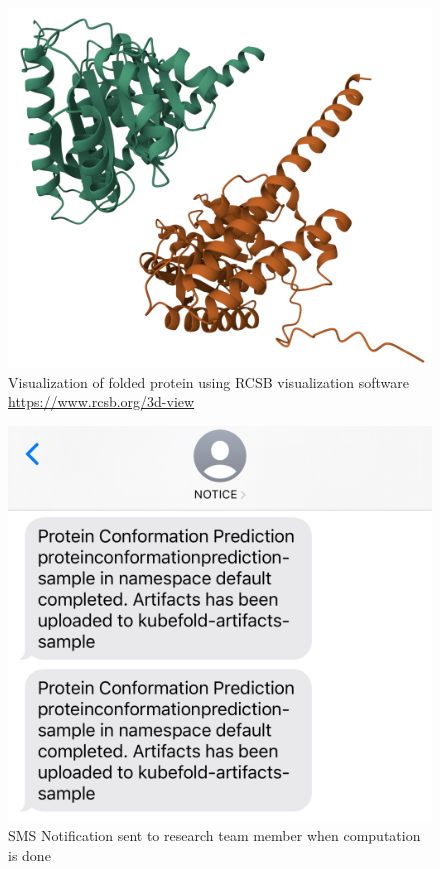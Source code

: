 \begin{figure}[htbp]
    \centering
    \includegraphics[width=\textwidth]{images/protein_visualization_small}
    \caption{Visualization of folded protein using RCSB visualization software \url{https://www.rcsb.org/3d-view}}
    \label{fig:protein_visualization}
\end{figure}

\begin{figure}[htbp]
    \centering
    \includegraphics[width=\textwidth]{images/sns_notification_light}
    \caption{SMS Notification sent to research team member when computation is done}
    \label{fig:sns_notification}
\end{figure}
